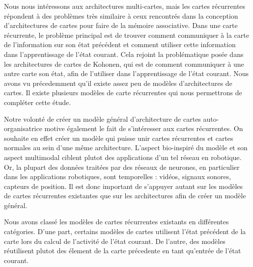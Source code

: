 Nous nous intéressons aux architectures multi-cartes, mais les cartes récurrentes répondent à des problèmes très similaire à ceux rencontrés dans la conception d'architectures de cartes pour faire de la mémoire associative. Dans une carte récurrente, le problème principal est de trouver comment communiquer à la carte de l'information sur son état précédent et comment utiliser cette information dans l'apprentissage de l'état courant. Cela rejoint la problématique posée dans les architectures de cartes de Kohonen, qui est de comment communiquer à une autre carte son état, afin de l'utiliser dans l'apprentissage de l'état courant. Nous avons vu précedemment qu'il existe assez peu de modèles d'architectures de cartes. Il existe plusieurs modèles de carte récurrentes qui nous permettrons de compléter cette étude. 

Notre volonté de créer un modèle général d'architecture de cartes auto-organisatrice motive également le fait de s'intéresser aux cartes récurrentes. On souhaite en effet créer un modèle qui puisse unir cartes récurrentes et cartes normales au sein d'une même architecture. L'aspect bio-inspiré du modèle et son aspect multimodal ciblent plutot des applications d'un tel réseau en robotique. Or, la plupart des données traitées par des réseaux de neurones, en particulier dans les applications robotiques, sont temporelles : vidéos, signaux sonores, capteurs de position. Il est donc important de s'appuyer autant sur les modèles de cartes récurrentes existantes que sur les architectures afin de créer un modèle général. 


Nous avons classé les modèles de cartes récurrentes existants en différentes catégories. D'une part, certains modèles de cartes utilisent l'état précédent de la carte lors du calcul de l'activité de l'état courant. De l'autre, des modèles réutilisent plutot des élement de la carte précedente en tant qu'entrée de l'état courant.

